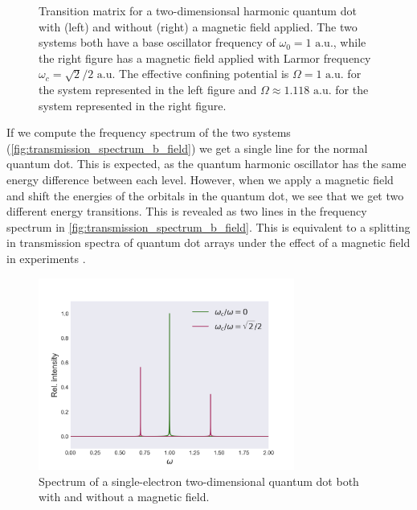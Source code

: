 \begin{figure}
\begin{center}
\begin{minipage}{0.45\textwidth}
    \end{minipage}        
    \end{center}
    \caption{Transition matrix for a two-dimensionsal harmonic quantum dot with (left) 
        and without (right) a magnetic field applied. The two systems both have a base oscillator 
        frequency of $\omega_0 = 1 \text{ a.u.}$, while the right figure has a magnetic field 
        applied with Larmor frequency $\omega_c = \sqrt{2}/2 \text{ a.u.}$ The effective 
        confining potential is $\Omega = 1 \text{ a.u.}$ for the system represented in the 
        left figure and $\Omega \approx 1.118 \text{ a.u.}$ for the system represented in 
        the right figure.
    }
    \label{fig:transition_yes_no_b}
\end{figure}

If we compute the frequency spectrum of the two systems
(\autoref{fig:transmission_spectrum_b_field}) we get a single line for the 
normal quantum dot. This is expected, as the quantum harmonic oscillator has 
the same energy difference between each level. However, when we apply a magnetic
field and shift the energies of the orbitals in the quantum dot, we see that we 
get two different energy transitions. This is revealed as two lines in the 
frequency spectrum in \autoref{fig:transmission_spectrum_b_field}. This is equivalent 
to a splitting in transmission spectra of quantum dot arrays under the effect 
of a magnetic field in experiments \cite{heitmann1993spectroscopy,meurer1992single}.

\begin{figure}
    \centering
    \includegraphics[width=0.75\textwidth]{results/figures/transmission_spectrum.png}
    \caption{Spectrum of a single-electron two-dimensional quantum dot both with and
        without a magnetic field.
    }
    \label{fig:transmission_spectrum_b_field}
\end{figure}


